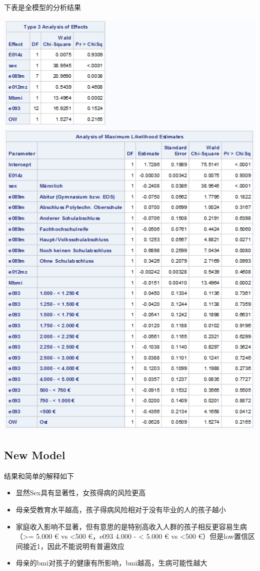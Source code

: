 \documentclass[
  10pt,
]{article}
\providecommand{\tightlist}{%
  \setlength{\itemsep}{0pt}\setlength{\parskip}{0pt}}
\begin{document}
下表是全模型的分析结果

\includegraphics[width=7.06in]{./Yimeng_Plots/M7_1}

\hypertarget{new-model}{%
\subsection{New Model}\label{new-model}}

结果和简单的解释如下

\begin{itemize}
\tightlist
\item
  显然Sex具有显著性，女孩得病的风险更高
\item
  母亲受教育水平越高，孩子得病风险相对于没有毕业的人的孩子越小
\item
  家庭收入影响不显著，但有意思的是特别高收入人群的孩子相反更容易生病
  （\textgreater= 5.000 € vs \textless500 €，e093 4.000 - \textless{}
  5.000 € vs \textless500
  €）但是low置信区间接近1，因此不能说明有普遍效应
\item
  母亲的bmi对孩子的健康有所影响，bmi越高，生病可能性越大
\end{itemize}
\end{document}
